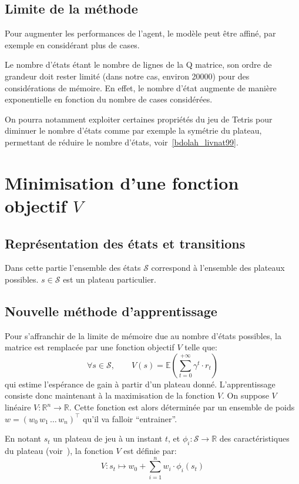 \documentclass{report}
\newcommand{\R}{\mathbb{R}}
\begin{document}
\section*{Limite de la méthode}
Pour augmenter les performances de l'agent, le modèle peut être affiné, par
exemple en considérant plus de cases.

Le nombre d'états étant le nombre de lignes de la Q matrice, son ordre de
grandeur doit rester limité (dans notre cas, environ 20000) pour des
considérations de mémoire. En effet, le nombre d'état augmente de manière
exponentielle en fonction du nombre de cases considérées.

On pourra notamment exploiter certaines propriétés du jeu de Tetris pour
diminuer le nombre d'états comme par exemple la symétrie du plateau, permettant
de réduire le nombre d'états, voir~\ref{bdolah_livnat99}.


\chapter{Minimisation d'une fonction objectif \(V\)}

\section{Représentation des états et transitions}

Dans cette partie l'ensemble des états \( \mathcal{S} \) correspond à l'ensemble
des plateaux possibles. \( s \in \mathcal{S} \) est un plateau particulier.

\section{Nouvelle méthode d'apprentissage}

Pour s'affranchir de la limite de mémoire due au nombre d'états possibles, la
matrice est remplacée par une fonction objectif \( V \) telle que:
\[
  \forall s \in \mathcal{S}, \qquad V(s) =
  \mathbb{E}\left(\sum_{t=0}^{+\infty} \gamma ^t \cdot r_t\right)
\]
qui estime l'espérance de gain à partir d'un plateau donné.
L'apprentissage consiste donc maintenant à la maximisation de la
fonction \( V \).
On suppose \( V \) linéaire \(V \colon \R^n \to \R\). Cette fonction est alors
déterminée par un ensemble de poids \(w = (w_0\, w_1\, \dots\, w_n)^\top\)
qu'il va falloir ``entrainer''.

En notant \( s_t \) un plateau de jeu à un instant \( t \), et
\(\phi_i\colon \mathcal{S} \to \R\) des caractéristiques du plateau
(voir~\cite{boumaza13}), la fonction \(V\)
est définie par:
\[
  V \colon s_t \mapsto w_0 + \sum_{i=1}^n w_i \cdot \phi_i (s_t)
\]
\end{document}
